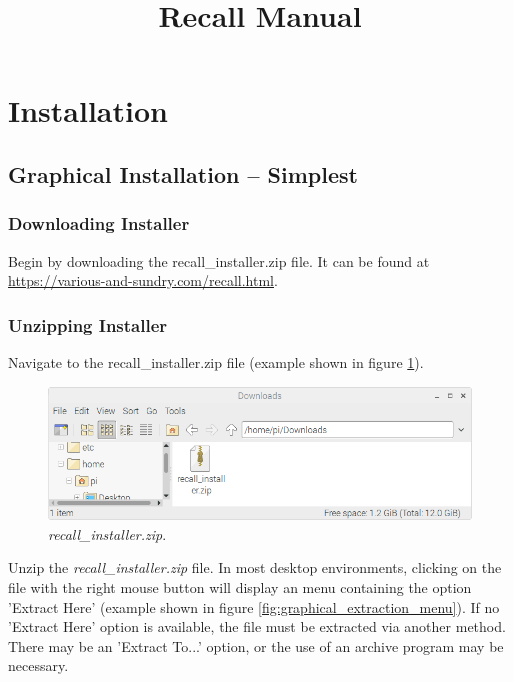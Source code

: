 \documentclass[letterpaper]{article}
\title{Recall Manual}
\begin{document}
\maketitle
\tableofcontents

\section{Installation}

\subsection{Graphical Installation -- Simplest} \label{graphical_install}
\subsubsection{Downloading Installer}
Begin by downloading the recall\_installer.zip file. It can be found at \href{https://various-and-sundry.com/recall.html}{https://various-and-sundry.com/recall.html}.

\subsubsection{Unzipping Installer}
Navigate to the recall\_installer.zip file (example shown in figure \ref{fig:graphical_zip_file}).

\begin{figure}[H]
  \centering
  \includegraphics[width=14cm]{images/graphical_install/zip_file.png}
  \caption{\textit{recall\_installer.zip}.}
  \label{fig:graphical_zip_file}
\end{figure}

Unzip the \textit{recall\_installer.zip} file. In most desktop environments, clicking on the file with the right mouse button will display an menu containing the option 'Extract Here' (example shown in figure \ref{fig:graphical_extraction_menu}). If no 'Extract Here' option is available, the file must be extracted via another method. There may be an 'Extract To...' option, or the use of an archive program may be necessary.
\end{document}
